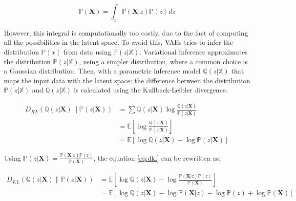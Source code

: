 \begin{equation}
 \mathbb{P}(\mathbf{X})=\int_{z} \mathbb{P}(\mathbf{X} | z) \mathbb{P}(z) d z
\end{equation}

However, this integral is computationally too costly, due to the fact of computing all the possibilities in the latent space. To avoid this, VAEs tries to infer the distribution \begin{math} \mathbb{P}( x ) \end{math} from data using \begin{math}\mathbb{P}(z|\mathbb{X})\end{math}. Variational inference approximates the distribution \begin{math}\mathbb{P}(z | \mathbb{X})\end{math}, using a simpler distribution, where a common choice is a Gaussian distribution. Then, with a parametric inference model \begin{math}\mathbb{Q}(z|\mathbb{X})\end{math} that maps the input data with the latent space; the difference between the distribution \begin{math}\mathbb{P}(z|\mathbb{X})\end{math} and \begin{math}\mathbb{Q}(z|\mathbb{X})\end{math} is calculated using the Kullback-Leibler divergence.

\begin{equation}
 \begin{aligned} D_{K L}(\mathbb{Q}(z | \mathbf{X}) \| \mathbb{P}(z | \mathbf{X})) &=\sum \mathbb{Q}(z | \mathbf{X}) \log \frac{\mathbb{Q}(z | \mathbf{X})}{\mathbb{P}(z | \mathbf{X})} \\ &=\mathbb{E}\left[\log \frac{\mathbb{Q}(z | \mathbf{X})}{\mathbb{P}(z | \mathbf{X})}\right] \\ &=\mathbb{E}[\log \mathbb{Q}(z | \mathbf{X})-\log \mathbb{P}(z | \mathbf{X})] \end{aligned}
 \label{eq:dkl}
\end{equation}

Using \begin{math}\mathbb{P}(z | \mathbf{X})=\frac{\mathbb{P}(\mathbf{X} | z) \mathbb{P}(z)}{\mathbb{P}(\mathbf{X})}\end{math}, the equation \ref{eq:dkl} can be rewritten as:

\begin{equation}
 \begin{aligned} D_{K L}(\mathbb{Q}(z | \mathbf{X}) \| \mathbb{P}(z | \mathbf{X})) &=\mathbb{E}\left[\log \mathbb{Q}(z | \mathbf{X})-\log \frac{\mathbb{P}(\mathbf{X} | z) \mathbb{P}(z)}{\mathbb{P}(\mathbf{X})}\right] \\ &=\mathbb{E}[\log \mathbb{Q}(z | \mathbf{X})-\log \mathbb{P}(\mathbf{X} | z)-\log \mathbb{P}(z)+\log \mathbb{P}(\mathbf{X})] \end{aligned}
\end{equation}

